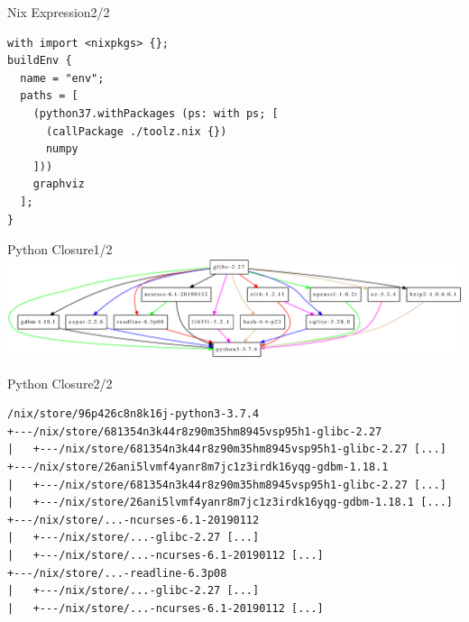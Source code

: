 \documentclass[12pt,aspectratio=169]{beamer}
\begin{document}

\begin{frame}[fragile]{Nix Expression\hfill2/2}
  \begin{verbatim}
with import <nixpkgs> {};
buildEnv {
  name = "env";
  paths = [
    (python37.withPackages (ps: with ps; [
      (callPackage ./toolz.nix {})
      numpy
    ]))
    graphviz
  ];
}
  \end{verbatim}
\end{frame}


\begin{frame}{Python Closure\hfill1/2}
\vspace{0.71cm}
\includegraphics[trim=300 0 0 0,height=0.72\paperheight]{images/python-closure.eps}
\end{frame}


\begin{frame}[fragile]{Python Closure\hfill2/2}
  \begin{verbatim}
/nix/store/96p426c8n8k16j-python3-3.7.4
+---/nix/store/681354n3k44r8z90m35hm8945vsp95h1-glibc-2.27
|   +---/nix/store/681354n3k44r8z90m35hm8945vsp95h1-glibc-2.27 [...]
+---/nix/store/26ani5lvmf4yanr8m7jc1z3irdk16yqg-gdbm-1.18.1
|   +---/nix/store/681354n3k44r8z90m35hm8945vsp95h1-glibc-2.27 [...]
|   +---/nix/store/26ani5lvmf4yanr8m7jc1z3irdk16yqg-gdbm-1.18.1 [...]
+---/nix/store/...-ncurses-6.1-20190112
|   +---/nix/store/...-glibc-2.27 [...]
|   +---/nix/store/...-ncurses-6.1-20190112 [...]
+---/nix/store/...-readline-6.3p08
|   +---/nix/store/...-glibc-2.27 [...]
|   +---/nix/store/...-ncurses-6.1-20190112 [...]
  \end{verbatim}
\end{frame}

\end{document}
